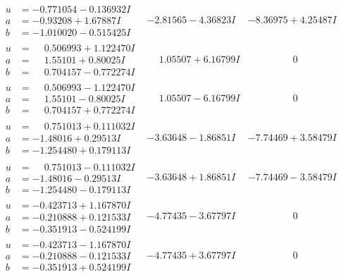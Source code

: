 \documentclass[1p]{elsarticle_modified}
\theoremstyle{definition}
\begin{document}
$$\begin{array}{c|c|c}
\begin{aligned}
u &= -0.771054 - 0.136932 I \\
a &= -0.93208 + 1.67887 I \\
b &= -1.010020 - 0.515425 I\end{aligned}
 & -2.81565 - 4.36823 I & -8.36975 + 4.25487 I \\ \hline\begin{aligned}
u &= \phantom{-}0.506993 + 1.122470 I \\
a &= \phantom{-}1.55101 + 0.80025 I \\
b &= \phantom{-}0.704157 - 0.772274 I\end{aligned}
 & \phantom{-}1.05507 + 6.16799 I & \phantom{-0.000000 } 0 \\ \hline\begin{aligned}
u &= \phantom{-}0.506993 - 1.122470 I \\
a &= \phantom{-}1.55101 - 0.80025 I \\
b &= \phantom{-}0.704157 + 0.772274 I\end{aligned}
 & \phantom{-}1.05507 - 6.16799 I & \phantom{-0.000000 } 0 \\ \hline\begin{aligned}
u &= \phantom{-}0.751013 + 0.111032 I \\
a &= -1.48016 + 0.29513 I \\
b &= -1.254480 + 0.179113 I\end{aligned}
 & -3.63648 - 1.86851 I & -7.74469 + 3.58479 I \\ \hline\begin{aligned}
u &= \phantom{-}0.751013 - 0.111032 I \\
a &= -1.48016 - 0.29513 I \\
b &= -1.254480 - 0.179113 I\end{aligned}
 & -3.63648 + 1.86851 I & -7.74469 - 3.58479 I \\ \hline\begin{aligned}
u &= -0.423713 + 1.167870 I \\
a &= -0.210888 + 0.121533 I \\
b &= -0.351913 - 0.524199 I\end{aligned}
 & -4.77435 - 3.67797 I & \phantom{-0.000000 } 0 \\ \hline\begin{aligned}
u &= -0.423713 - 1.167870 I \\
a &= -0.210888 - 0.121533 I \\
b &= -0.351913 + 0.524199 I\end{aligned}
 & -4.77435 + 3.67797 I & \phantom{-0.000000 } 0 \\ \hline\begin{aligned}

\end{aligned}
\end{array}$$
\end{document}
